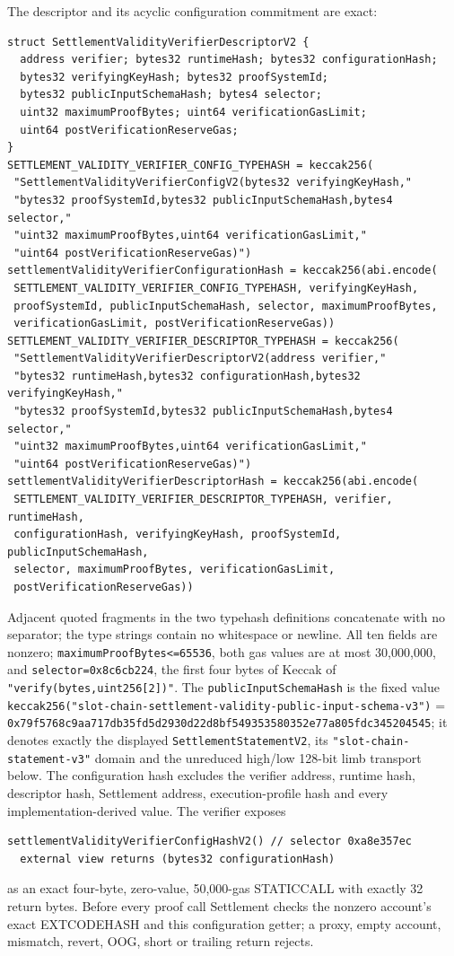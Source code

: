 \documentclass[a4paper,11pt]{article}
\newcommand{\code}[1]{\nolinkurl{#1}}
\begin{document}
The descriptor and its acyclic configuration commitment are exact:
\begin{verbatim}
struct SettlementValidityVerifierDescriptorV2 {
  address verifier; bytes32 runtimeHash; bytes32 configurationHash;
  bytes32 verifyingKeyHash; bytes32 proofSystemId;
  bytes32 publicInputSchemaHash; bytes4 selector;
  uint32 maximumProofBytes; uint64 verificationGasLimit;
  uint64 postVerificationReserveGas;
}
SETTLEMENT_VALIDITY_VERIFIER_CONFIG_TYPEHASH = keccak256(
 "SettlementValidityVerifierConfigV2(bytes32 verifyingKeyHash,"
 "bytes32 proofSystemId,bytes32 publicInputSchemaHash,bytes4 selector,"
 "uint32 maximumProofBytes,uint64 verificationGasLimit,"
 "uint64 postVerificationReserveGas)")
settlementValidityVerifierConfigurationHash = keccak256(abi.encode(
 SETTLEMENT_VALIDITY_VERIFIER_CONFIG_TYPEHASH, verifyingKeyHash,
 proofSystemId, publicInputSchemaHash, selector, maximumProofBytes,
 verificationGasLimit, postVerificationReserveGas))
SETTLEMENT_VALIDITY_VERIFIER_DESCRIPTOR_TYPEHASH = keccak256(
 "SettlementValidityVerifierDescriptorV2(address verifier,"
 "bytes32 runtimeHash,bytes32 configurationHash,bytes32 verifyingKeyHash,"
 "bytes32 proofSystemId,bytes32 publicInputSchemaHash,bytes4 selector,"
 "uint32 maximumProofBytes,uint64 verificationGasLimit,"
 "uint64 postVerificationReserveGas)")
settlementValidityVerifierDescriptorHash = keccak256(abi.encode(
 SETTLEMENT_VALIDITY_VERIFIER_DESCRIPTOR_TYPEHASH, verifier, runtimeHash,
 configurationHash, verifyingKeyHash, proofSystemId, publicInputSchemaHash,
 selector, maximumProofBytes, verificationGasLimit,
 postVerificationReserveGas))
\end{verbatim}
Adjacent quoted fragments in the two typehash definitions concatenate with no
separator; the type strings contain no whitespace or newline.
All ten fields are nonzero; \code{maximumProofBytes<=65536}, both gas values
are at most 30,000,000, and \code{selector=0x8c6cb224}, the first four bytes of
Keccak of \code{"verify(bytes,uint256[2])"}.  The
\code{publicInputSchemaHash} is the fixed value
\code{keccak256("slot-chain-settlement-validity-public-input-schema-v3")} =
\code{0x79f5768c9aa717db35fd5d2930d22d8bf549353580352e77a805fdc345204545};
it denotes exactly the displayed \code{SettlementStatementV2}, its
\code{"slot-chain-statement-v3"} domain and the unreduced high/low 128-bit
limb transport below.  The configuration hash excludes
the verifier address, runtime hash, descriptor hash, Settlement address,
execution-profile hash and every implementation-derived value.
The verifier exposes
\begin{verbatim}
settlementValidityVerifierConfigHashV2() // selector 0xa8e357ec
  external view returns (bytes32 configurationHash)
\end{verbatim}
as an exact four-byte, zero-value, 50,000-gas STATICCALL with exactly 32 return
bytes.  Before every proof call Settlement checks the nonzero account's exact
EXTCODEHASH and this configuration getter; a proxy, empty account, mismatch,
revert, OOG, short or trailing return rejects.
\end{document}
